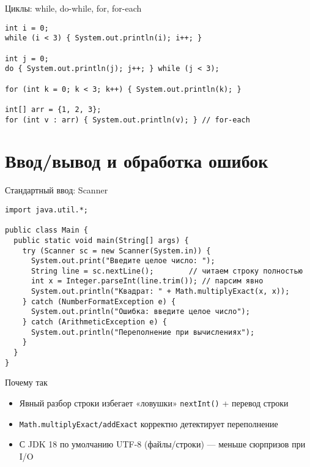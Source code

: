 \documentclass[aspectratio=169]{beamer}
\begin{document}
\begin{frame}[fragile]{Циклы: while, do-while, for, for-each}
\lstset{language=JavaLite}
\begin{lstlisting}
int i = 0;
while (i < 3) { System.out.println(i); i++; }

int j = 0;
do { System.out.println(j); j++; } while (j < 3);

for (int k = 0; k < 3; k++) { System.out.println(k); }

int[] arr = {1, 2, 3};
for (int v : arr) { System.out.println(v); } // for-each
\end{lstlisting}
\end{frame}

\section{Ввод/вывод и обработка ошибок}

\begin{frame}[fragile]{Стандартный ввод: Scanner}
\lstset{language=JavaLite}
\begin{lstlisting}
import java.util.*;

public class Main {
  public static void main(String[] args) {
    try (Scanner sc = new Scanner(System.in)) {
      System.out.print("Введите целое число: ");
      String line = sc.nextLine();        // читаем строку полностью
      int x = Integer.parseInt(line.trim()); // парсим явно
      System.out.println("Квадрат: " + Math.multiplyExact(x, x));
    } catch (NumberFormatException e) {
      System.out.println("Ошибка: введите целое число");
    } catch (ArithmeticException e) {
      System.out.println("Переполнение при вычислениях");
    }
  }
}
\end{lstlisting}
\begin{block}{Почему так}
  \begin{itemize}
    \item Явный разбор строки избегает «ловушки» \texttt{nextInt()} + перевод строки
    \item \texttt{Math.multiplyExact/addExact} корректно детектирует переполнение
    \item С JDK 18 по умолчанию UTF-8 (файлы/строки) — меньше сюрпризов при I/O
  \end{itemize}
\end{block}
\end{frame}
\end{document}
